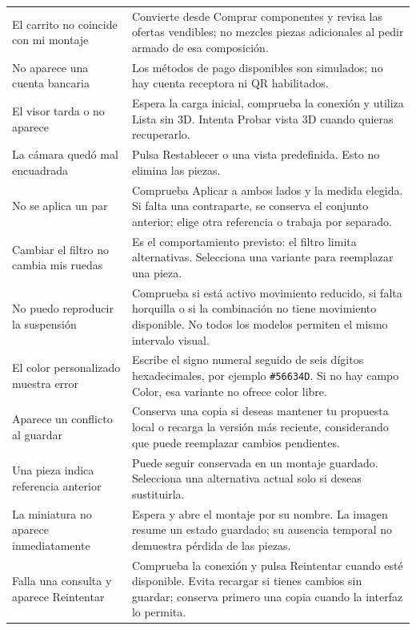 \documentclass[12pt,letterpaper]{article}
\newenvironment{tabla}{\begingroup\singlespacing\small\setlength{\tabcolsep}{5pt}\renewcommand{\arraystretch}{1.25}}{\endgroup}
\begin{document}
\begin{tabla}
\begin{longtable}{L{4.2cm}L{9.9cm}}
El carrito no coincide con mi montaje & Convierte desde Comprar componentes y revisa las ofertas vendibles; no mezcles piezas adicionales al pedir armado de esa composición.\\
No aparece una cuenta bancaria & Los métodos de pago disponibles son simulados; no hay cuenta receptora ni QR habilitados.\\
El visor tarda o no aparece & Espera la carga inicial, comprueba la conexión y utiliza Lista sin 3D. Intenta Probar vista 3D cuando quieras recuperarlo.\\
La cámara quedó mal encuadrada & Pulsa Restablecer o una vista predefinida. Esto no elimina las piezas.\\
No se aplica un par & Comprueba Aplicar a ambos lados y la medida elegida. Si falta una contraparte, se conserva el conjunto anterior; elige otra referencia o trabaja por separado.\\
Cambiar el filtro no cambia mis ruedas & Es el comportamiento previsto: el filtro limita alternativas. Selecciona una variante para reemplazar una pieza.\\
No puedo reproducir la suspensión & Comprueba si está activo movimiento reducido, si falta horquilla o si la combinación no tiene movimiento disponible. No todos los modelos permiten el mismo intervalo visual.\\
El color personalizado muestra error & Escribe el signo numeral seguido de seis dígitos hexadecimales, por ejemplo \texttt{\#56634D}. Si no hay campo Color, esa variante no ofrece color libre.\\
Aparece un conflicto al guardar & Conserva una copia si deseas mantener tu propuesta local o recarga la versión más reciente, considerando que puede reemplazar cambios pendientes.\\
Una pieza indica referencia anterior & Puede seguir conservada en un montaje guardado. Selecciona una alternativa actual solo si deseas sustituirla.\\
La miniatura no aparece inmediatamente & Espera y abre el montaje por su nombre. La imagen resume un estado guardado; su ausencia temporal no demuestra pérdida de las piezas.\\
Falla una consulta y aparece Reintentar & Comprueba la conexión y pulsa Reintentar cuando esté disponible. Evita recargar si tienes cambios sin guardar; conserva primero una copia cuando la interfaz lo permita.\\\bottomrule
\end{longtable}\end{tabla}
\end{document}
